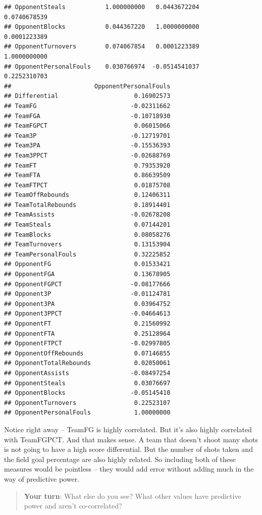 \documentclass[]{book}
\begin{document}
\begin{verbatim}
## OpponentSteals           1.000000000   0.0443672204      0.0740678539
## OpponentBlocks           0.044367220   1.0000000000      0.0001223389
## OpponentTurnovers        0.074067854   0.0001223389      1.0000000000
## OpponentPersonalFouls    0.030766974  -0.0514541037      0.2252310703
##                       OpponentPersonalFouls
## Differential                     0.16902573
## TeamFG                          -0.02311662
## TeamFGA                         -0.10718930
## TeamFGPCT                        0.06015066
## Team3P                          -0.12719701
## Team3PA                         -0.15536393
## Team3PPCT                       -0.02688769
## TeamFT                           0.79353920
## TeamFTA                          0.86639509
## TeamFTPCT                        0.01875708
## TeamOffRebounds                  0.12406311
## TeamTotalRebounds                0.18914401
## TeamAssists                     -0.02678208
## TeamSteals                       0.07144201
## TeamBlocks                       0.08058276
## TeamTurnovers                    0.13153904
## TeamPersonalFouls                0.32225852
## OpponentFG                       0.01533421
## OpponentFGA                      0.13678905
## OpponentFGPCT                   -0.08177666
## Opponent3P                      -0.01124781
## Opponent3PA                      0.03964752
## Opponent3PPCT                   -0.04664613
## OpponentFT                       0.21560992
## OpponentFTA                      0.25128964
## OpponentFTPCT                   -0.02997805
## OpponentOffRebounds              0.07146855
## OpponentTotalRebounds            0.02050061
## OpponentAssists                 -0.08497254
## OpponentSteals                   0.03076697
## OpponentBlocks                  -0.05145410
## OpponentTurnovers                0.22523107
## OpponentPersonalFouls            1.00000000
\end{verbatim}

Notice right away -- TeamFG is highly correlated. But it's also highly correlated with TeamFGPCT. And that makes sense. A team that doesn't shoot many shots is not going to have a high score differential. But the number of shots taken and the field goal percentage are also highly related. So including both of these measures would be pointless -- they would add error without adding much in the way of predictive power.

\begin{quote}
\textbf{Your turn}: What else do you see? What other values have predictive power and aren't co-correlated?
\end{quote}
\end{document}
